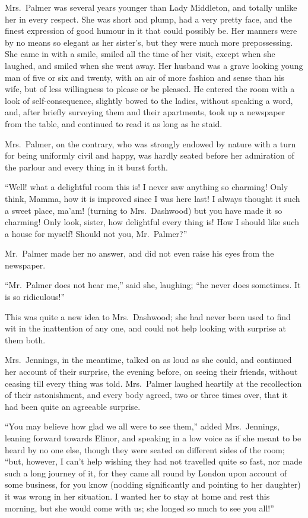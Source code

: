 \documentclass{article}
\begin{document}
Mrs.\ Palmer was several years younger than Lady
Middleton, and totally unlike her in every respect.
She was short and plump, had a very pretty face,
and the finest expression of good humour in it that could
possibly be.  Her manners were by no means so elegant
as her sister's, but they were much more prepossessing.
She came in with a smile, smiled all the time of her visit,
except when she laughed, and smiled when she went away.
Her husband was a grave looking young man of five or six
and twenty, with an air of more fashion and sense than
his wife, but of less willingness to please or be pleased.
He entered the room with a look of self-consequence,
slightly bowed to the ladies, without speaking a word,
and, after briefly surveying them and their apartments,
took up a newspaper from the table, and continued to read it
as long as he staid.

Mrs.\ Palmer, on the contrary, who was strongly endowed
by nature with a turn for being uniformly civil and happy,
was hardly seated before her admiration of the parlour
and every thing in it burst forth.

``Well! what a delightful room this is! I never
saw anything so charming!  Only think, Mamma, how it
is improved since I was here last! I always thought it
such a sweet place, ma'am! (turning to Mrs.\ Dashwood)
but you have made it so charming!  Only look, sister,
how delightful every thing is! How I should like such
a house for myself!  Should not you, Mr.\ Palmer?''

Mr.\ Palmer made her no answer, and did not even raise
his eyes from the newspaper.

``Mr.\ Palmer does not hear me,'' said she, laughing;
``he never does sometimes.  It is so ridiculous!''

This was quite a new idea to Mrs.\ Dashwood; she had
never been used to find wit in the inattention of any one,
and could not help looking with surprise at them both.

Mrs.\ Jennings, in the meantime, talked on as loud
as she could, and continued her account of their surprise,
the evening before, on seeing their friends, without
ceasing till every thing was told.  Mrs.\ Palmer laughed
heartily at the recollection of their astonishment,
and every body agreed, two or three times over, that it
had been quite an agreeable surprise.

``You may believe how glad we all were to see them,''
added Mrs.\ Jennings, leaning forward towards Elinor,
and speaking in a low voice as if she meant to be heard
by no one else, though they were seated on different sides
of the room; ``but, however, I can't help wishing they had
not travelled quite so fast, nor made such a long journey
of it, for they came all round by London upon account
of some business, for you know (nodding significantly and
pointing to her daughter) it was wrong in her situation.
I wanted her to stay at home and rest this morning,
but she would come with us; she longed so much to see
you all!''
\end{document}
